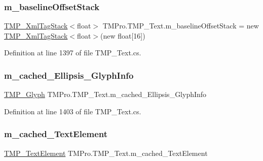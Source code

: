 \subsubsection{\texorpdfstring{m\_baselineOffsetStack}{m\_baselineOffsetStack}}
{\footnotesize\ttfamily \mbox{\hyperlink{struct_t_m_pro_1_1_t_m_p___xml_tag_stack}{T\+M\+P\+\_\+\+Xml\+Tag\+Stack}}$<$float$>$ T\+M\+Pro.\+T\+M\+P\+\_\+\+Text.\+m\+\_\+baseline\+Offset\+Stack = new \mbox{\hyperlink{struct_t_m_pro_1_1_t_m_p___xml_tag_stack}{T\+M\+P\+\_\+\+Xml\+Tag\+Stack}}$<$float$>$(new float\mbox{[}16\mbox{]})\hspace{0.3cm}{\ttfamily [protected]}}



Definition at line 1397 of file T\+M\+P\+\_\+\+Text.\+cs.

\mbox{\label{class_t_m_pro_1_1_t_m_p___text_a8dd4da482f8f99af1a9828383e8485a7}} 
\subsubsection{\texorpdfstring{m\_cached\_Ellipsis\_GlyphInfo}{m\_cached\_Ellipsis\_GlyphInfo}}
{\footnotesize\ttfamily \mbox{\hyperlink{class_t_m_pro_1_1_t_m_p___glyph}{T\+M\+P\+\_\+\+Glyph}} T\+M\+Pro.\+T\+M\+P\+\_\+\+Text.\+m\+\_\+cached\+\_\+\+Ellipsis\+\_\+\+Glyph\+Info\hspace{0.3cm}{\ttfamily [protected]}}



Definition at line 1403 of file T\+M\+P\+\_\+\+Text.\+cs.

\mbox{\label{class_t_m_pro_1_1_t_m_p___text_accfbe93901f6a1d73d8cc2591c362949}} 
\subsubsection{\texorpdfstring{m\_cached\_TextElement}{m\_cached\_TextElement}}
{\footnotesize\ttfamily \mbox{\hyperlink{class_t_m_pro_1_1_t_m_p___text_element}{T\+M\+P\+\_\+\+Text\+Element}} T\+M\+Pro.\+T\+M\+P\+\_\+\+Text.\+m\+\_\+cached\+\_\+\+Text\+Element\hspace{0.3cm}{\ttfamily [protected]}}



